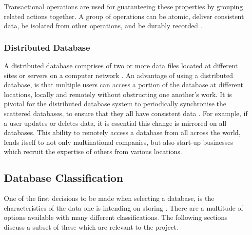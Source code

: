 Transactional operations are used for guaranteeing these properties by grouping related actions together. A group of operations can be atomic, deliver consistent data, be isolated from other operations, and be durably recorded \cite{acidtrans}.

\subsubsection{Distributed Database}\label{distributeddb}
A distributed database comprises of two or more data files located at different sites or servers on a computer network \cite{dd}. An advantage of using a distributed database, is that multiple users can access a portion of the database at different locations, locally and remotely without obstructing one another's work. It is pivotal for the distributed database system to periodically synchronise the scattered databases, to ensure that they all have consistent data \cite{dd}. For example, if a user updates or deletes data, it is essential this change is mirrored on all databases. This ability to remotely access a database from all across the world, lends itself to not only multinational companies, but also start-up businesses which recruit the expertise of others from various locations.

\subsection{Database Classification}\label{dbclass}
One of the first decisions to be made when selecting a database, is the characteristics of the data one is intending on storing \cite{nosql2}. There are a multitude of options available with many different classifications. The following sections discuss a subset of these which are relevant to the project.

